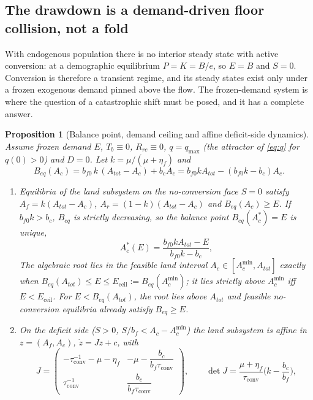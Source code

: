 \documentclass[preprint,12pt,authoryear]{elsarticle}
\newtheorem{proposition}{Proposition}
\newcommand{\Eceil}{E_{\mathrm{ceil}}}
\newcommand{\Acmin}{A_c^{\min}}
\newcommand{\tconv}{\tau_{\mathrm{conv}}}
\begin{document}
\subsection{The drawdown is a demand-driven floor collision, not a fold}\label{sec:ceiling}

With endogenous population there is no interior steady state with active conversion: at a demographic equilibrium $P=K=B/e$, so $E=B$ and $S=0$. Conversion is therefore a transient regime, and its steady states exist only under a frozen exogenous demand pinned above the flow. The frozen-demand system is where the question of a catastrophic shift must be posed, and it has a complete answer.

\begin{proposition}[Balance point, demand ceiling and affine deficit-side dynamics]\label{prop:ceiling}
Assume frozen demand $E$, $T_b\equiv0$, $R_{rc}\equiv0$, $q=q_{\max}$ (the attractor of \eqref{eq:q} for $q(0)>0$) and $D=0$. Let $k=\mu/(\mu+\eta_f)$ and
\begin{equation}\label{eq:Beq}
B_{eq}(A_c)=b_{f0}\,k\,(A_{tot}-A_c)+b_cA_c=b_{f0}kA_{tot}-(b_{f0}k-b_c)A_c .
\end{equation}
\begin{enumerate}[label=(\roman*)]
\item Equilibria of the land subsystem on the no-conversion face $S=0$ satisfy $A_f=k(A_{tot}-A_c)$, $A_r=(1-k)(A_{tot}-A_c)$ and $B_{eq}(A_c)\ge E$. If $b_{f0}k>b_c$, $B_{eq}$ is strictly decreasing, so the balance point $B_{eq}(A_c^*)=E$ is unique,
\begin{equation}\label{eq:Acstar}
A_c^*(E)=\frac{b_{f0}kA_{tot}-E}{b_{f0}k-b_c},
\end{equation}
The algebraic root lies in the feasible land interval $A_c\in[\Acmin,A_{tot}]$ exactly when $B_{eq}(A_{tot})\le E\le\Eceil:=B_{eq}(\Acmin)$; it lies strictly above $\Acmin$ iff $E<\Eceil$. For $E<B_{eq}(A_{tot})$, the root lies above $A_{tot}$ and feasible no-conversion equilibria already satisfy $B_{eq}\ge E$.
\item On the deficit side ($S>0$, $S/b_f<A_c-\Acmin$) the land subsystem is affine in $z=(A_f,A_c)$, $\dot z=Jz+c$, with
\begin{equation}\label{eq:J}
J=\begin{pmatrix}-\tconv^{-1}-\mu-\eta_f & -\mu-\dfrac{b_c}{b_f\tconv}\\[8pt] \tconv^{-1} & \dfrac{b_c}{b_f\tconv}\end{pmatrix},
\qquad \det J=\frac{\mu+\eta_f}{\tconv}\Big(k-\frac{b_c}{b_f}\Big),

\end{equation}
\end{enumerate}
\end{proposition}
\end{document}
